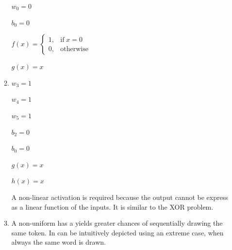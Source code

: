 \documentclass{article}
\begin{document}
\begin{enumerate}[label = (\alph*)]
\begin{enumerate}[label = (\roman*)]
    $w_0=0$
    
    $b_0=0$
    
    $f(x)=\begin{cases}
      1, & \text{if} \; x=0\\
      0, & \text{otherwise}
    \end{cases}$
    
    $g(x) = x$
    
    \item
    $w_3=1$
    
    $w_4=1$
    
    $w_5=1$
    
    $b_2=0$
    
    $b_0=0$
    
    $g(x) = x$
    
    $h(x) = x$
    
    A non-linear activation is required because the output cannot be express as a linear function of the inputs. It is similar to the XOR problem. 
    
    \item
    A non-uniform has a yields greater chances of sequentially drawing the same token. 
    In can be intuitively depicted using an extreme case, when always the same word is drawn. 
    
	\end{enumerate}
    
\end{enumerate}


\clearpage
\newpage
\end{document}
